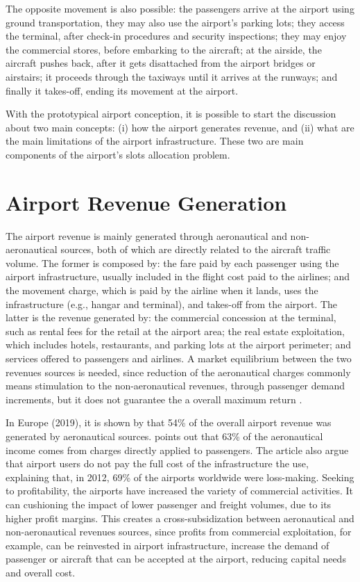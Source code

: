 The opposite movement is also possible: the passengers arrive at the airport using ground transportation, they may also use the airport’s parking lots; they access the terminal, after check-in procedures and security inspections; they may enjoy the commercial stores, before embarking to the aircraft; at the airside, the aircraft pushes back, after it gets disattached from the airport bridges or airstairs; it proceeds through the taxiways until it arrives at the runways; and finally it takes-off, ending its movement at the airport. 

With the prototypical airport conception, it is possible to start the discussion about two main concepts: (i) how the airport generates revenue, and (ii) what are the main limitations of the airport infrastructure. These two are main components of the airport’s slots allocation problem.

\section{Airport Revenue Generation}
\label{revGen}

The airport revenue is mainly generated through aeronautical and non-aeronautical sources, both of which are directly related to the aircraft traffic volume. The former is composed by: the fare paid by each passenger using the airport infrastructure, usually included in the flight cost paid to the airlines; and the movement charge, which is paid by the airline when it lands, uses the infrastructure (e.g., hangar and terminal), and takes-off from the airport. The latter is the revenue generated by: the commercial concession at the terminal, such as rental fees for the retail at the airport area; the real estate exploitation, which includes hotels, restaurants, and parking lots at the airport perimeter; and services offered to passengers and airlines. A market equilibrium between the two revenues sources is needed, since reduction of the aeronautical charges commonly means stimulation to the non-aeronautical revenues, through passenger demand increments, but it does not guarantee the a overall maximum return \cite{ICAO2013}.

In Europe (2019), it is shown by  that 54\% of the overall airport revenue was generated by aeronautical sources.  points out that 63\% of the  aeronautical income comes from charges directly applied to passengers. The article also argue that airport users do not pay the full cost of the infrastructure the use, explaining that, in 2012, 69\% of the airports worldwide were loss-making. Seeking to profitability, the airports have increased the variety of commercial activities. It can cushioning the impact of lower passenger and freight volumes, due to its higher profit margins. This creates a cross-subsidization between aeronautical and non-aeronautical revenues sources, since profits from commercial exploitation, for example, can be reinvested in airport infrastructure, increase the demand of passenger or aircraft that can be accepted at the airport, reducing capital needs and overall cost.

